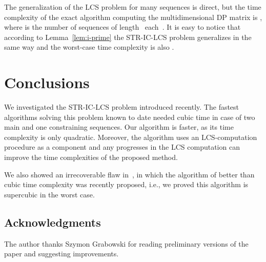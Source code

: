 \documentclass[12pt]{article}
\begin{document}
The generalization of the LCS problem for many sequences is direct, but the time complexity of the exact algorithm computing the multidimensional DP matrix is , where  is the number of sequences of length~ each~\cite{Gus1997}.
It is easy to notice that according to Lemma~\ref{lem:i-prime} the STR-IC-LCS problem generalizes in the same way and the worst-case time complexity is also .


\section{Conclusions}
\label{sec:concs}
We investigated the STR-IC-LCS problem introduced recently.
The fastest algorithms solving this problem known to date needed cubic time in case of two main and one constraining sequences.
Our algorithm is faster, as its time complexity is only quadratic.
Moreover, the algorithm uses an LCS-computation procedure as a component and any progresses in the LCS computation can improve the time complexities of the proposed method.

We also showed an irrecoverable flaw in~\cite{FFMR2010}, in which the algorithm of better than cubic time complexity was recently proposed, i.e., we proved this algorithm is supercubic in the worst case.

\subsection*{Acknowledgments}
The author thanks Szymon Grabowski for reading preliminary versions of the paper and suggesting improvements.
\end{document}
